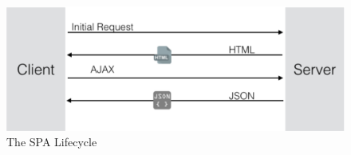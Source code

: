 \begin{figure}[htb] %
 \centering
 \includegraphics[width=1.0\linewidth]{images/chapter4/spa.png}\hfill
 \caption[The SPA Lifecycle]{The SPA Lifecycle}
 \label{fig:fourV}
\end{figure}